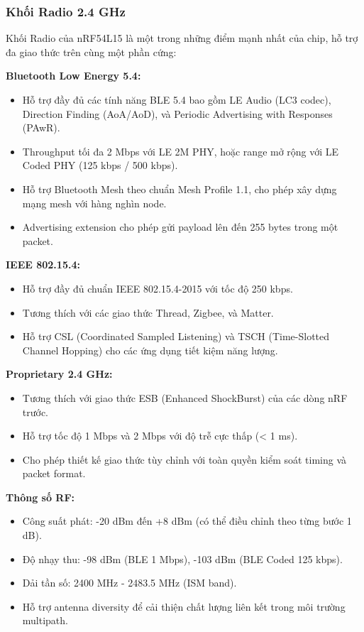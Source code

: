 \subsubsection{Khối Radio 2.4 GHz}

Khối Radio của nRF54L15 là một trong những điểm mạnh nhất của chip, hỗ trợ đa giao thức trên cùng một phần cứng:

\textbf{Bluetooth Low Energy 5.4:}
\begin{itemize}
    \item Hỗ trợ đầy đủ các tính năng BLE 5.4 bao gồm LE Audio (LC3 codec), Direction Finding (AoA/AoD), và Periodic Advertising with Responses (PAwR).
    \item Throughput tối đa 2 Mbps với LE 2M PHY, hoặc range mở rộng với LE Coded PHY (125 kbps / 500 kbps).
    \item Hỗ trợ Bluetooth Mesh theo chuẩn Mesh Profile 1.1, cho phép xây dựng mạng mesh với hàng nghìn node.
    \item Advertising extension cho phép gửi payload lên đến 255 bytes trong một packet.
\end{itemize}

\textbf{IEEE 802.15.4:}
\begin{itemize}
    \item Hỗ trợ đầy đủ chuẩn IEEE 802.15.4-2015 với tốc độ 250 kbps.
    \item Tương thích với các giao thức Thread, Zigbee, và Matter.
    \item Hỗ trợ CSL (Coordinated Sampled Listening) và TSCH (Time-Slotted Channel Hopping) cho các ứng dụng tiết kiệm năng lượng.
\end{itemize}

\textbf{Proprietary 2.4 GHz:}
\begin{itemize}
    \item Tương thích với giao thức ESB (Enhanced ShockBurst) của các dòng nRF trước.
    \item Hỗ trợ tốc độ 1 Mbps và 2 Mbps với độ trễ cực thấp (< 1 ms).
    \item Cho phép thiết kế giao thức tùy chỉnh với toàn quyền kiểm soát timing và packet format.
\end{itemize}

\textbf{Thông số RF:}
\begin{itemize}
    \item Công suất phát: -20 dBm đến +8 dBm (có thể điều chỉnh theo từng bước 1 dB).
    \item Độ nhạy thu: -98 dBm (BLE 1 Mbps), -103 dBm (BLE Coded 125 kbps).
    \item Dải tần số: 2400 MHz - 2483.5 MHz (ISM band).
    \item Hỗ trợ antenna diversity để cải thiện chất lượng liên kết trong môi trường multipath.
\end{itemize}

